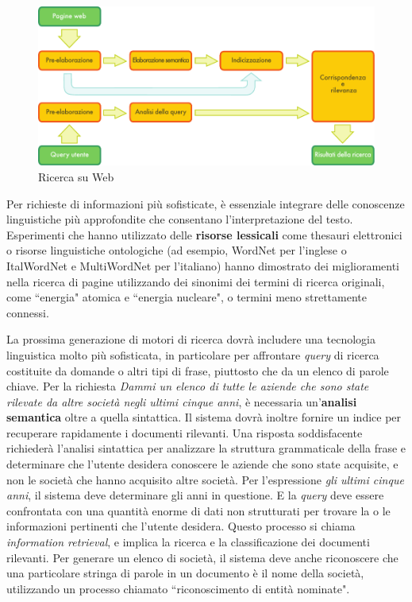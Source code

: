 \begin{multicols}{2}
\begin{figure}[htb]
  \center
  \includegraphics[width=\textwidth]{../_media/italian/web_search_architecture}
  \caption{Ricerca su Web}
  \label{fig:websearcharch_de}
\end{figure}

Per richieste di informazioni pi\`{u} sofisticate, \`{e} essenziale integrare
delle conoscenze linguistiche pi\`{u} approfondite che consentano
l'interpretazione del testo. Esperimenti che hanno utilizzato delle
\textbf{risorse lessicali} come thesauri elettronici o risorse linguistiche
ontologiche (ad esempio, WordNet per l'inglese o ItalWordNet e MultiWordNet
per l'italiano) hanno dimostrato dei miglioramenti nella ricerca di pagine
utilizzando dei sinonimi dei termini di ricerca originali, come “energia"
atomica e “energia nucleare", o termini meno strettamente connessi.

La prossima generazione di motori di ricerca dovr\`{a} includere una
tecnologia linguistica molto pi\`{u} sofisticata, in particolare per
affrontare \emph{query} di ricerca costituite da domande o altri tipi di
frase, piuttosto che da un elenco di parole chiave. Per la richiesta \emph{Dammi un
elenco di tutte le aziende che sono state rilevate da altre societ\`{a} negli
ultimi cinque anni}, \`{e} necessaria un'\textbf{analisi semantica} oltre a quella sintattica. Il sistema dovr\`{a} inoltre fornire un indice per recuperare rapidamente i documenti rilevanti. Una risposta soddisfacente
richieder\`{a} l'analisi sintattica per analizzare la struttura grammaticale
della frase e determinare che l'utente desidera conoscere le aziende che sono
state acquisite, e non le societ\`{a} che hanno acquisito altre
societ\`{a}. Per l'espressione \emph{gli ultimi cinque anni}, il sistema deve
determinare gli anni in questione. E la \emph{query} deve essere confrontata
con una quantit\`{a} enorme di dati non strutturati per trovare la o le
informazioni pertinenti che l'utente desidera. Questo processo si chiama
\emph{information retrieval}, e implica la ricerca e la classificazione dei 
documenti rilevanti. Per generare un elenco di societ\`{a}, il sistema deve 
anche riconoscere che una particolare stringa di parole in un documento \`{e} 
il nome della societ\`{a}, utilizzando un processo chiamato “riconoscimento di entit\`{a}
nominate".


\end{multicols}

